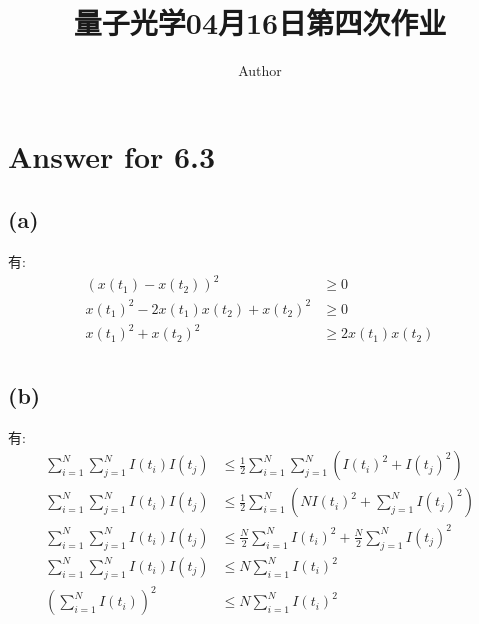 \documentclass[twoside]{article}
\begin{document}
\title{量子光学04月16日第四次作业}
\author{Author}
\pagestyle{fancy}
\makeatletter
\fancyhead[L]{\@title}
\fancyhead[R]{\@author}
\makeatother
\setlength{\parindent}{0pt}

\providecommand{\mathdefault}[1]{#1}
\section*{Answer for 6.3}

\subsection*{(a)}

有:
\begin{equation*}
    \begin{split}
        \left(x(t_1) - x(t_2)\right)^2      & \geqslant 0             \\
        x(t_1)^2 - 2x(t_1)x(t_2) + x(t_2)^2 & \geqslant 0             \\
        x(t_1)^2 + x(t_2)^2                 & \geqslant 2x(t_1)x(t_2) \\
    \end{split}
\end{equation*}


\subsection*{(b)}

有:
\begin{equation*}
    \begin{split}
        \sum_{i=1}^{N} \sum_{j=1}^{N} I(t_i) I(t_j) & \leqslant \frac{1}{2} \sum_{i=1}^{N} \sum_{j=1}^{N} \left(I(t_i)^2 + I(t_j)^2\right)    \\
        \sum_{i=1}^{N} \sum_{j=1}^{N} I(t_i) I(t_j) & \leqslant \frac{1}{2} \sum_{i=1}^{N} \left( N I(t_i)^2 + \sum_{j=1}^{N} I(t_j)^2\right) \\
        \sum_{i=1}^{N} \sum_{j=1}^{N} I(t_i) I(t_j) & \leqslant \frac{N}{2} \sum_{i=1}^{N} I(t_i)^2 + \frac{N}{2} \sum_{j=1}^{N} I(t_j)^2     \\
        \sum_{i=1}^{N} \sum_{j=1}^{N} I(t_i) I(t_j) & \leqslant N \sum_{i=1}^{N} I(t_i)^2                                                     \\
        \left(\sum_{i=1}^{N} I(t_i)\right)^2        & \leqslant N \sum_{i=1}^{N} I(t_i)^2                                                     \\
    \end{split}
\end{equation*}
\end{document}
